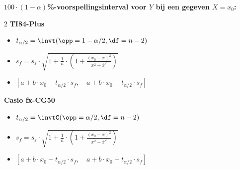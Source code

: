 \textbf{\boldmath$100\cdot(1-\alpha)$\si{\percent}-voorspellingsinterval voor $Y$ bij een gegeven $X = x_0$:}
    \begin{multicols}{2}
        \centering\textbf{TI84-Plus}
        \begin{itemize}
            \item $t_{\alpha/2} = \invt(\opp=1-\alpha/2, \df = n - 2)$
            \item $s_f = s_{\varepsilon} \cdot \sqrt{ 1 + \frac{1}{n} \cdot \left( 1 + \frac{(x_0 - \overline{x})^2}{\overline{x^2} - \overline{x}^2} \right) }$
            \item $[a+b\cdot x_0 - t_{\alpha/2} \cdot s_f, \quad a+b\cdot x_0 + t_{\alpha/2} \cdot s_f]$
        \end{itemize}
        \columnbreak
        \centering\textbf{Casio fx-CG50}
        \begin{itemize}
            \item $t_{\alpha/2} = \invtC(\opp=\alpha/2, \df = n - 2)$
            \item $s_f = s_{\varepsilon} \cdot \sqrt{ 1 + \frac{1}{n} \cdot \left( 1 + \frac{(x_0 - \overline{x})^2}{\overline{x^2} - \overline{x}^2} \right) }$
            \item $[a+b\cdot x_0 - t_{\alpha/2} \cdot s_f, \quad a+b\cdot x_0 + t_{\alpha/2} \cdot s_f]$
        \end{itemize}
    \end{multicols}






